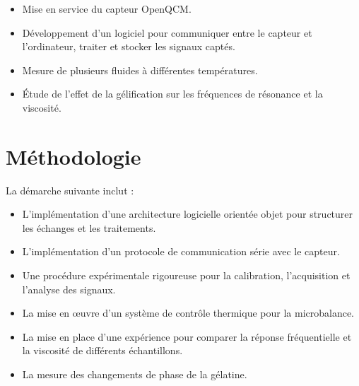 \begin{itemize}[label=\textbullet]
    \item Mise en service du capteur OpenQCM.
    \item Développement d'un logiciel pour communiquer entre le capteur et l'ordinateur, traiter et stocker les signaux captés.
    \item Mesure de plusieurs fluides à différentes températures.
    \item Étude de l'effet de la gélification sur les fréquences de résonance et la viscosité.
\end{itemize}

\section{Méthodologie}

La démarche suivante inclut :
\begin{itemize}[label=\textbullet]
    \item L’implémentation d’une architecture logicielle orientée objet pour structurer les échanges et les traitements.
    \item L’implémentation d’un protocole de communication série avec le capteur.
    \item Une procédure expérimentale rigoureuse pour la calibration, l'acquisition et l’analyse des signaux.
    \item La mise en œuvre d’un système de contrôle thermique pour la microbalance.
    \item La mise en place d'une expérience pour comparer la réponse fréquentielle et la viscosité de différents échantillons.
    \item La mesure des changements de phase de la gélatine.
\end{itemize}






